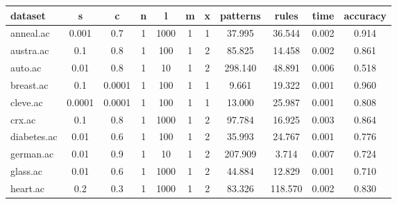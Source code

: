 \begin{table}[htbp]
	\centering
		\begin{tabular}{|l|c|c|c|c|c|c|c|c|c|c|}
		\hline
		\textbf{dataset}	& \textbf{s}	& \textbf{c}	& \textbf{n}	& \textbf{l}	& \textbf{m}	& \textbf{x}	& \textbf{patterns}	& \textbf{rules}	& \textbf{time}	& \textbf{accuracy}	\\
		\hline
		anneal.ac      & 0.001    & 0.7         & 1              & 1000                & 1             & 1             & 37.995         & 36.544         & 0.002          & 0.914          \\
		\hline
		austra.ac      & 0.1      & 0.8         & 1              & 100                 & 1             & 2             & 85.825         & 14.458         & 0.002          & 0.861          \\
		\hline
		auto.ac        & 0.01     & 0.8         & 1              & 10                  & 1             & 2             & 298.140        & 48.891         & 0.006          & 0.518          \\
		\hline
		breast.ac      & 0.1      & 0.0001      & 1              & 100                 & 1             & 1             & 9.661          & 19.322         & 0.001          & 0.960          \\
		\hline
		cleve.ac       & 0.0001   & 0.0001      & 1              & 100                 & 1             & 1             & 13.000         & 25.987         & 0.001          & 0.808          \\
		\hline
		crx.ac         & 0.1      & 0.8         & 1              & 1000                & 1             & 2             & 97.784         & 16.925         & 0.003          & 0.864          \\
		\hline
		diabetes.ac    & 0.01     & 0.6         & 1              & 100                 & 1             & 2             & 35.993         & 24.767         & 0.001          & 0.776          \\
		\hline
		german.ac      & 0.01     & 0.9         & 1              & 10                  & 1             & 2             & 207.909        & 3.714          & 0.007          & 0.724          \\
		\hline
		glass.ac       & 0.01     & 0.6         & 1              & 1000                & 1             & 2             & 44.884         & 12.829         & 0.001          & 0.710          \\
		\hline
		heart.ac       & 0.2      & 0.3         & 1              & 1000                & 1             & 2             & 83.326         & 118.570        & 0.002          & 0.830          \\

\end{tabular}
\end{table}

